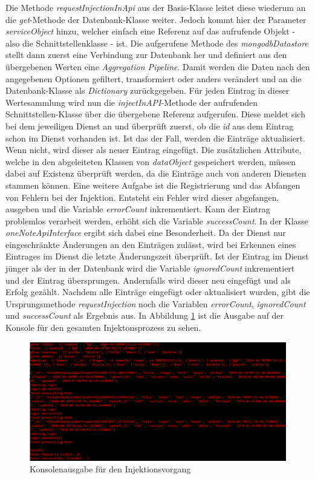 Die Methode \textit{requestInjectionInApi} aus der Basis-Klasse leitet diese wiederum an die \textit{get}-Methode der Datenbank-Klasse weiter. Jedoch kommt hier der Parameter \textit{serviceObject} hinzu, welcher einfach eine Referenz auf das aufrufende Objekt - also die Schnittstellenklasse - ist. Die aufgerufene Methode des \textit{mongodbDatastore} stellt dann zuerst eine Verbindung zur Datenbank her und definiert aus den übergebenen Werten eine \textit{Aggregation Pipeline}. Damit werden die Daten nach den angegebenen Optionen gefiltert, transformiert oder anders verändert und an die Datenbank-Klasse als \textit{Dictionary} zurückgegeben. Für jeden Eintrag in dieser Wertesammlung wird nun die \textit{injectInAPI}-Methode der aufrufenden Schnittstellen-Klasse über die übergebene Referenz aufgerufen. Diese meldet sich bei dem jeweiligen Dienst an und überprüft zuerst, ob die \textit{id} aus dem Eintrag schon im Dienst vorhanden ist. Ist das der Fall, werden die Einträge aktualisiert. Wenn nicht, wird dieser als neuer Eintrag eingefügt. Die zusätzlichen Attribute, welche in den abgeleiteten Klassen von \textit{dataObject} gespeichert werden, müssen dabei auf Existenz überprüft werden, da die Einträge auch von anderen Diensten stammen können. Eine weitere Aufgabe ist die Registrierung und das Abfangen von Fehlern bei der Injektion. Entsteht ein Fehler wird dieser abgefangen, ausgeben und die Variable \textit{errorCount} inkrementiert. Kann der Eintrag problemlos verarbeit werden, erhöht sich die Variable \textit{successCount}. In der Klasse \textit{oneNoteApiInterface} ergibt sich dabei eine Besonderheit. Da der Dienst nur eingeschränkte Änderungen an den Einträgen zulässt, wird bei Erkennen eines Eintrages im Dienst die letzte Änderungszeit überprüft. Ist der Eintrag im Dienst jünger als der in der Datenbank wird die Variable \textit{ignoredCount} inkrementiert und der Eintrag übersprungen. Andernfalls wird dieser neu eingefügt und als Erfolg gezählt. Nachdem alle Einträge eingefügt oder aktualisiert wurden, gibt die Ursprungsmethode \textit{requestInjection} noch die Variablen \textit{errorCount}, \textit{ignoredCount} und \textit{successCount} als Ergebnis aus. In Abbildung \ref{fig:bspInj} ist die Ausgabe auf der Konsole für den gesamten Injektonsprozess zu sehen. 

\begin{figure}[H]
	\centering
	\includegraphics[width=1\textwidth]{Bilder/umsetzung/BeispielInject.png}
	\caption{Konsolenausgabe für den Injektionsvorgang}
	\label{fig:bspInj}
\end{figure}

